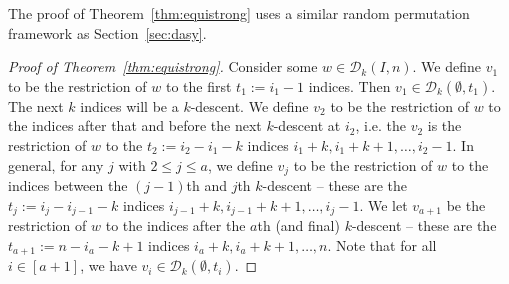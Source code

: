 \documentclass{amsart}
\theoremstyle{definition}
\begin{document}
The proof of Theorem~\ref{thm:equistrong} uses a similar random permutation framework as Section~\ref{sec:dasy}.
\begin{proof}[Proof of Theorem~\ref{thm:equistrong}]
Consider some $w\in \mathcal{D}_k(I,n)$. We define $v_1$ to be the restriction of $w$ to the first $t_1:=i_1-1$ indices. Then $v_1\in \mathcal{D}_k(\emptyset,t_1)$. The next $k$ indices will be a $k$-descent. We define $v_2$ to be the restriction of $w$ to the indices after that and before the next $k$-descent at $i_2$, i.e. the $v_2$ is the restriction of $w$ to the $t_2:=i_2-i_1-k$ indices $i_1+k,i_1+k+1,\ldots,i_2-1$. In general, for any $j$ with $2\leq j\leq a$, we define $v_j$ to be the restriction of $w$ to the indices between the $(j-1)$th and $j$th $k$-descent -- these are the $t_j:=i_j-i_{j-1}-k$ indices $i_{j-1}+k,i_{j-1}+k+1,\ldots, i_j-1$. We let $v_{a+1}$ be the restriction of $w$ to the indices after the $a$th (and final) $k$-descent -- these are the $t_{a+1}:=n-i_a-k+1$ indices $i_a+k,i_a+k+1,\ldots, n$. Note that for all $i\in [a+1]$, we have $v_i\in \mathcal{D}_k(\emptyset,t_i)$. 


\end{proof}
\end{document}
